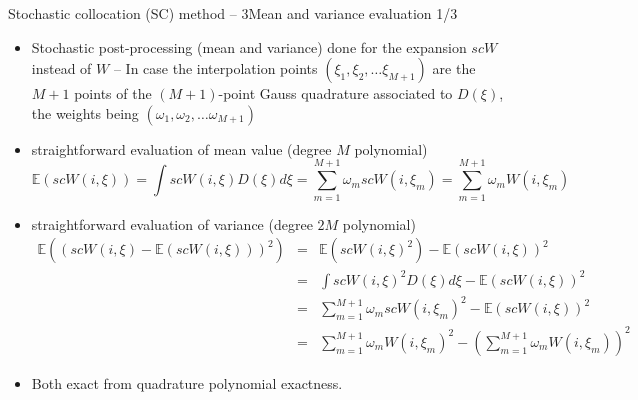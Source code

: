 \documentclass[10pt]{beamer}
\def\vr{\vspace{3mm}}
\def\begit{\begin{itemize}}
\def\endit{\end{itemize}}
\def\beas{\begin{eqnarray*}}
\def\eeas{\end{eqnarray*}}
\newcommand{\esp}{{\mathbb E}}
\begin{document}
%
%
\begin{frame}{Stochastic collocation (SC) method -- 3}{Mean and variance evaluation 1/3} 

\scriptsize{
\begit
\item Stochastic post-processing (mean and variance) done for the expansion $scW$ instead of $W$
 -- In case the interpolation points $(\xi_1, \xi_2,\dots\xi_{M+1})$ are the $M+1$ points of the $(M+1)$-point Gauss quadrature associated to $D(\xi)$,
 the weights being $(\omega_1, \omega_2,\dots\omega_{M+1})$ 
\vr
\item straightforward evaluation of mean value (degree $M$ polynomial)
     $$ \esp(scW(i,\xi)) = \int scW(i,\xi) D(\xi) d\xi= \sum_{m=1}^{M+1} \omega_m scW(i,\xi_m) = \sum_{m=1}^{M+1} \omega_m W(i,\xi_m)  $$
%
\item straightforward evaluation of variance (degree $2M$ polynomial)
 \beas
     \esp((scW(i,\xi)-\esp(scW(i,\xi)))^2)&=&   \esp(scW(i,\xi)^2) -\esp(scW(i,\xi))^2 \\
                 &=&   \int scW(i,\xi)^2 D(\xi)d\xi  -\esp(scW(i,\xi))^2      \\
                 &=&   \sum_{m=1}^{M+1} \omega_m  scW(i,\xi_m)^2  -\esp(scW(i,\xi))^2\\
                 &=&  \sum_{m=1}^{M+1}  \omega_m W(i,\xi_m)^2- \left(\sum_{m=1}^{M+1} \omega_m W(i, \xi_m)\right)^2
\eeas
   \item Both exact from quadrature polynomial exactness. 
\endit
}
%
\end{frame} 
%
%
\end{document}
